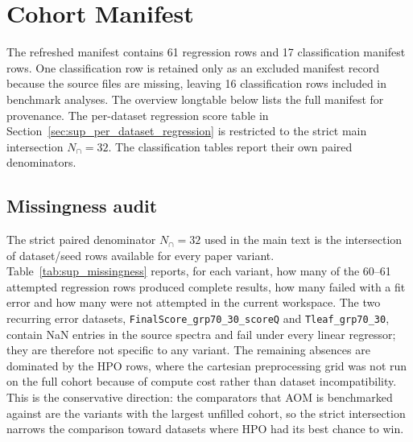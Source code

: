 \documentclass[11pt,a4paper]{article}
\newcommand{\code}[1]{\nolinkurl{#1}}
\begin{document}
\section{Cohort Manifest}

The refreshed manifest contains 61 regression rows and 17 classification
manifest rows.  One classification row is retained only as an excluded
manifest record because the source files are missing, leaving 16
classification rows included in benchmark analyses.  The overview longtable
below lists the full manifest for provenance.  The per-dataset regression
score table in Section~\ref{sec:sup_per_dataset_regression} is restricted to
the strict main intersection $N_{\cap}=32$.  The classification tables report
their own paired denominators.

\begin{table}[h]
\centering
\caption{Cohort denominator summary.}
\small

\end{table}



\subsection{Missingness audit}
\label{sec:sup_missingness}

The strict paired denominator $N_{\cap}=32$ used in the main text is the
intersection of dataset/seed rows available for every paper variant.
Table~\ref{tab:sup_missingness} reports, for each variant, how many of the
60--61 attempted regression rows produced complete results, how many failed
with a fit error and how many were not attempted in the current workspace.
The two recurring error datasets,
\code{FinalScore\_grp70\_30\_scoreQ} and \code{Tleaf\_grp70\_30}, contain NaN
entries in the source spectra and fail under every linear regressor; they are
therefore not specific to any variant.  The remaining absences are dominated
by the HPO rows, where the cartesian preprocessing grid was not run on the
full cohort because of compute cost rather than dataset incompatibility.
This is the conservative direction: the comparators that AOM is benchmarked
against are the variants with the largest unfilled cohort, so the strict
intersection narrows the comparison toward datasets where HPO had its best
chance to win.

\begin{table}[h]
\centering
\caption{Per-variant cohort coverage and absence reasons.  ``Complete'' counts
datasets with finite RMSEP across the requested seed budget; ``Error'' counts
datasets where the fit raised an exception (almost always NaN in the source
spectra); ``Not attempted'' counts datasets the workspace did not schedule.}
\label{tab:sup_missingness}
\small

\end{table}
\end{document}
